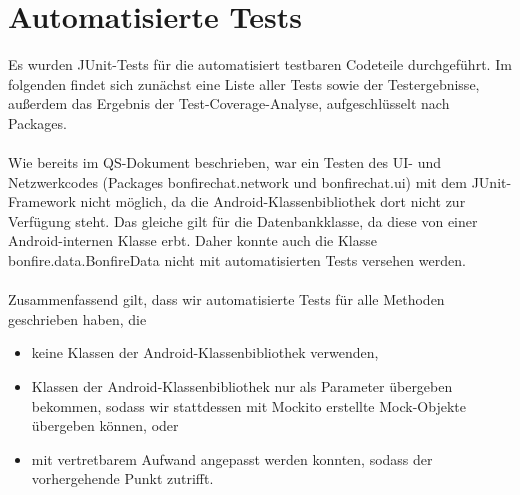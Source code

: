 




\clearpage
\section{Automatisierte Tests}

Es wurden JUnit-Tests für die automatisiert testbaren Codeteile durchgeführt.
Im folgenden findet sich zunächst eine Liste aller Tests sowie der Testergebnisse,
außerdem das Ergebnis der Test-Coverage-Analyse, aufgeschlüsselt nach Packages.
\\\\
Wie bereits im QS-Dokument beschrieben, war ein Testen des UI- und Netzwerkcodes
(Packages bonfirechat.network und bonfirechat.ui)
mit dem JUnit-Framework nicht möglich, da die Android-Klassenbibliothek dort nicht
zur Verfügung steht. Das gleiche gilt für die Datenbankklasse, da diese von einer
Android-internen Klasse erbt. Daher konnte auch die Klasse bonfire.data.BonfireData
nicht mit automatisierten Tests versehen werden.
\\\\
Zusammenfassend gilt, dass wir automatisierte Tests für alle Methoden geschrieben haben,
die
\begin{itemize}
\item keine Klassen der Android-Klassenbibliothek verwenden,
\item Klassen der Android-Klassenbibliothek nur als Parameter übergeben bekommen,
sodass wir stattdessen mit Mockito erstellte Mock-Objekte übergeben können, oder
\item mit vertretbarem Aufwand angepasst werden konnten, sodass der vorhergehende Punkt zutrifft.
\end{itemize}






